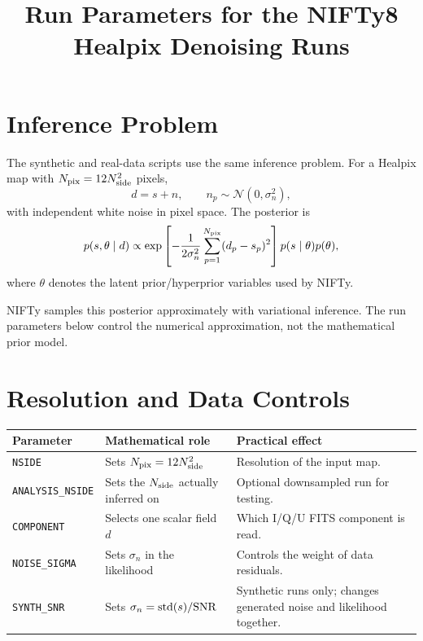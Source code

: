 \documentclass[11pt]{article}
\title{Run Parameters for the NIFTy8 Healpix Denoising Runs}
\author{}
\date{}
\begin{document}
\maketitle

\section{Inference Problem}

The synthetic and real-data scripts use the same inference problem.  For a
Healpix map with $N_{\rm pix}=12N_{\rm side}^2$ pixels,
\begin{equation}
    d = s + n,
    \qquad
    n_p \sim \mathcal{N}(0,\sigma_n^2),
\end{equation}
with independent white noise in pixel space.  The posterior is
\begin{equation}
    p(s,\theta \mid d)
    \propto
    \exp\left[
        -\frac{1}{2\sigma_n^2}
        \sum_{p=1}^{N_{\rm pix}} (d_p - s_p)^2
    \right]
    p(s\mid\theta)p(\theta),
\end{equation}
where $\theta$ denotes the latent prior/hyperprior variables used by NIFTy.

NIFTy samples this posterior approximately with variational inference.  The
run parameters below control the numerical approximation, not the mathematical
prior model.

\section{Resolution and Data Controls}

\begin{center}
\small
\begin{tabularx}{\textwidth}{lXX}
\toprule
Parameter & Mathematical role & Practical effect \\
\midrule
\texttt{NSIDE}
& Sets $N_{\rm pix}=12N_{\rm side}^2$
& Resolution of the input map. \\
\texttt{ANALYSIS\_NSIDE}
& Sets the $N_{\rm side}$ actually inferred on
& Optional downsampled run for testing. \\
\texttt{COMPONENT}
& Selects one scalar field $d$
& Which I/Q/U FITS component is read. \\
\texttt{NOISE\_SIGMA}
& Sets $\sigma_n$ in the likelihood
& Controls the weight of data residuals. \\
\texttt{SYNTH\_SNR}
& Sets $\sigma_n = {\rm std}(s)/{\rm SNR}$
& Synthetic runs only; changes generated noise and likelihood together. \\
\bottomrule
\end{tabularx}
\end{center}
\end{document}
